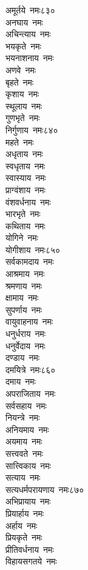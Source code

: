 \begin{multicols}{2}
\begin{flushleft}
अमूर्तये~नमः\hfill ८३०\\
अनघाय~नमः\\
अचिन्त्याय~नमः\\
भयकृते~नमः\\
भयनाशनाय~नमः\\
अणवे~नमः\\
बृहते~नमः\\
कृशाय~नमः\\
स्थूलाय~नमः\\
गुणभृते~नमः\\
निर्गुणाय~नमः\hfill ८४०\\
महते~नमः\\
अधृताय~नमः\\
स्वधृताय~नमः\\
स्वास्याय~नमः\\
प्राग्वंशाय~नमः\\
वंशवर्धनाय~नमः\\
भारभृते~नमः\\
कथिताय~नमः\\
योगिने~नमः\\
योगीशाय~नमः\hfill ८५०\\
सर्वकामदाय~नमः\\
आश्रमाय~नमः\\
श्रमणाय~नमः\\
क्षामाय~नमः\\
सुपर्णाय~नमः\\
वायुवाहनाय~नमः\\
धनुर्धराय~नमः\\
धनुर्वेदाय~नमः\\
दण्डाय~नमः\\
दमयित्रे~नमः\hfill ८६०\\
दमाय~नमः\\
अपराजिताय~नमः\\
सर्वसहाय~नमः\\
नियन्त्रे~नमः\\
अनियमाय~नमः\\
अयमाय~नमः\\
सत्त्ववते~नमः\\
सात्त्विकाय~नमः\\
सत्याय~नमः\\
सत्यधर्मपरायणाय~नमः\hfill ८७०\\
अभिप्रायाय~नमः\\
प्रियार्हाय~नमः\\
अर्हाय~नमः\\
प्रियकृते~नमः\\
प्रीतिवर्धनाय~नमः\\
विहायसगतये~नमः\\

\end{flushleft}
\end{multicols}
